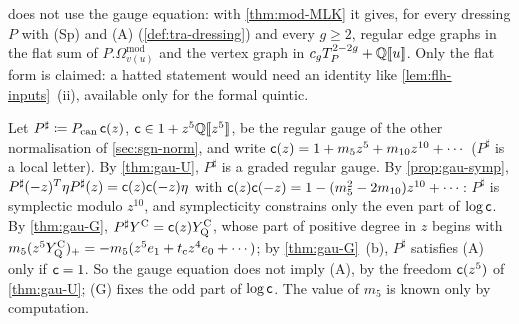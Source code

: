 \begin{rmk}
\label{rmk:mai-annih}
 does not use the gauge equation: with \cref{thm:mod-MLK} it gives, for every dressing $P$ with (Sp) and (A) (\cref{def:tra-dressing}) and every $g\geq2$, regular edge graphs in the flat sum of $P.\Omega^{\mathrm{mod}}_{v(u)}$ and the vertex graph in $c_gT_P^{2-2g}+\mathbb{Q}[\![ u ]\!]$. Only the flat form is claimed: a hatted statement would need an identity like \cref{lem:flh-inputs}~(ii), available only for the formal quintic.
\end{rmk}

\begin{rmk}
\label{rmk:mai-stored}
Let $P^\sharp\coloneqq P_{\mathrm{can}}\,\mathsf{c}(z)$, $\mathsf{c}\in1+z^5\mathbb{Q}[\![ z^5 ]\!]$, be the regular gauge of the other normalisation of \cref{sec:sgn-norm}, and write $\mathsf{c}(z)=1+m_5z^5+m_{10}z^{10}+\cdots$ ($P^\sharp$ is a local letter). By \cref{thm:gau-U}, $P^\sharp$ is a graded regular gauge. By \cref{prop:gau-symp}, $P^\sharp(-z)^T\eta P^\sharp(z)=\mathsf{c}(z)\mathsf{c}(-z)\eta$ with $\mathsf{c}(z)\mathsf{c}(-z)=1-(m_5^2-2m_{10})z^{10}+\cdots$: $P^\sharp$ is symplectic modulo $z^{10}$, and symplecticity constrains only the even part of $\log\mathsf{c}$. By \cref{thm:gau-G}, $P^\sharp Y^{\mathrm{C}}=\mathsf{c}(z)Y^{\mathrm{C}}_{\mathrm{Q}}$, whose part of positive degree in $z$ begins with $m_5(z^5Y^{\mathrm{C}}_{\mathrm{Q}})_{+}=-m_5(z^5e_1+t_{\mathrm{c}} z^4e_0+\cdots)$; by \cref{thm:gau-G}~(b), $P^\sharp$ satisfies (A) only if $\mathsf{c}=1$. So the gauge equation does not imply (A), by the freedom $\mathsf{c}(z^5)$ of \cref{thm:gau-U}; (G) fixes the odd part of $\log\mathsf{c}$. The value of $m_5$ is known only by computation.
\end{rmk}

